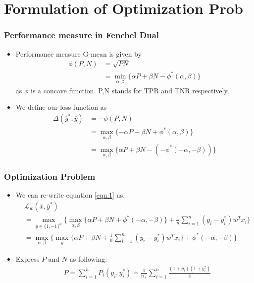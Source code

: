 \documentclass{beamer}
\begin{document}
\section{Formulation of Optimization Prob}
\begin{frame}
	\frametitle{Performance measure in Fenchel Dual}
	\begin{itemize}
	\item Performance measure G-mean is given by
	\begin{align*}
		\phi(P,N) &=\sqrt{PN}\\
		& = \min_{\alpha,\beta}\{\alpha P+\beta N - \phi^*(\alpha,\beta)\}
	\end{align*}
	as $\phi$ is a concave function. P,N stands for TPR and TNR respectively.
	\item We define our loss function as
	\begin{align*}
		\Delta(\overline{y}^*,\overline{y}) &= -\phi(P,N) \\
		&= \max_{\alpha,\beta}\{-\alpha P-\beta N + \phi^*(\alpha,\beta)\}\\
		&= \max_{\alpha,\beta}\{\alpha P+\beta N - (-\phi^*(-\alpha,-\beta))\}
	\end{align*}
	\end{itemize}
\end{frame}


\begin{frame}
	\frametitle{Optimization Problem}
	\begin{itemize}
	\item We can re-write equation \ref{eqn:1} as,
	\begin{align*}
	&\mathcal L_w(\overline{x},\overline{y}^*)\\
	&=\max_{\overline{y}\in\{1,-1\}^n}\{\max_{\alpha,\beta}\{\alpha P+\beta N +\phi^*(-\alpha,-\beta)\} + \frac{1}{n}\sum_{i=1}^n (y_i - y_i^*)w^Tx_i\}\\
	&=\max_{\alpha,\beta}\{\max_{\overline{y}}\{\alpha P+\beta N  + \frac{1}{n}\sum_{i=1}^n (y_i - y_i^*)w^Tx_i\}+\phi^*(-\alpha,-\beta)\}
	\end{align*}
	\item Express $P$ and $N$ as following:
	\begin{align*}
	&P = \sum_{i=1}^nP_i(y_i,y_i^*)= \frac{1}{n_+}\sum_{i=1}^n\frac{(1+y_i)(1+y_i^*)}{4}
	\end{align*}
	\end{itemize}
\end{frame}
\end{document}
